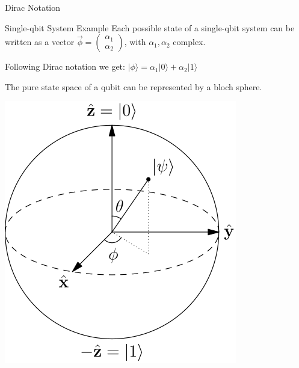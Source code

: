 \documentclass[svgnames,smaller,aspectratio=169]{beamer}
\begin{document}
\begin{frame}[fragile]{Dirac Notation}

  \begin{block}{Single-qbit System Example}
    Each possible state of a single-qbit system can be written as a vector $\vec{\phi} = \begin{pmatrix} \alpha_1 \\ \alpha_2 \end{pmatrix}$, with $\alpha_1, \alpha_2$ complex.
    
    Following Dirac notation we get: $ |\phi\rangle = \alpha_1 |0\rangle + \alpha_2 |1\rangle $
  \end{block}

  \begin{center}
    The pure state space of a qubit can be represented by a bloch sphere.
 
    \includegraphics[height=.3\textheight]{bloch}
  \end{center}
\end{frame}
\end{document}
